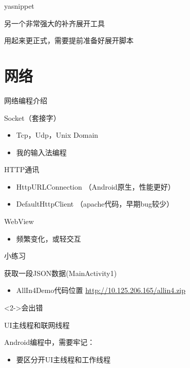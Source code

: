 \documentclass[presentation,dvipdfmx,CJKbookmarks]{beamer}
\begin{document}
\begin{CJK*}{UTF8}{simsun}
\begin{frame}[label={sec:org9a576c5}]{yasnippet}
\begin{block}{另一个非常强大的补齐展开工具}
\end{block}
\begin{block}{用起来更正式，需要提前准备好展开脚本}
\end{block}
\end{frame}

\section{网络}
\label{sec:org4ac40a5}
\begin{frame}[label={sec:orgaca18fb}]{网络编程介绍}
\begin{block}{Socket（套接字）}
\begin{itemize}
\item Tcp，Udp，Unix Domain
\item 我的输入法编程
\end{itemize}
\end{block}

\begin{block}{HTTP\thinspace 通讯}
\begin{itemize}
\item HttpURLConnection （Android\thinspace 原生，性能更好）
\item DefaultHttpClient （apache\thinspace 代码，早期\thinspace bug\thinspace 较少）
\end{itemize}
\end{block}

\begin{block}{WebView}
\begin{itemize}
\item 频繁变化，或轻交互
\end{itemize}
\end{block}
\end{frame}


\begin{frame}[label={sec:orgdd0c634}]{小练习}
\begin{block}{获取一段\thinspace JSON\thinspace 数据\thinspace (MainActivity1)}
\begin{itemize}
\item AllIn4Demo\thinspace 代码位置
\url{http://10.125.206.165/allin4.zip}
\end{itemize}
\end{block}
\begin{block}<2->{会出错}
\end{block}
\end{frame}
\begin{frame}[label={sec:org0e65b44}]{UI\thinspace 主线程和联网线程}
\begin{block}{Android\thinspace 编程中，需要牢记：}
\begin{itemize}
\item 要区分开\thinspace UI\thinspace 主线程和工作线程
\end{itemize}
\end{block}


\end{frame}
\end{CJK*}
\end{document}
